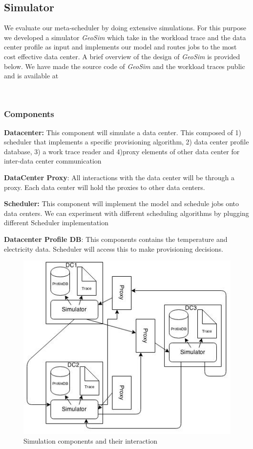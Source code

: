 \documentclass[conference,12pt]{IEEEtran}
\begin{document}
\subsection{Simulator}
\label{sec:simdesign}
We evaluate our meta-scheduler by doing extensive simulations. For this purpose we developed a simulator \textit{GeoSim} which take in the workload trace and the data center profile as input and implements our model and routes jobs to the most cost effective data center. A brief overview of the design of \textit{GeoSim} is provided below. We have made the source code of \textit{GeoSim} and the workload traces public and is available at \cite{sourcecode} 

\

\subsubsection{Components}
\begin{list2} %
\item \textbf{Datacenter:} This component will simulate a data center. This composed of 1) scheduler that implements a specific provisioning algorithm, 2) data center profile database, 3) a work trace reader and 4)proxy elements of other data center for inter-data center communication\
\item \textbf{DataCenter Proxy}: All interactions with the data center will be through a proxy. Each data center will hold the proxies to other data centers.\
\item \textbf{Scheduler:} This component will implement the model and schedule jobs onto data centers. We can experiment with different scheduling algorithms by plugging different Scheduler implementation\
\item \textbf{Datacenter Profile DB}: This components contains the temperature and electricity data. Scheduler will access this to make provisioning decisions.\
\end{list2}

\begin{figure}[] 
\centering
\includegraphics[scale=0.45]{comp_diag}
\caption{Simulation components and their interaction}
\label{fig:component}
\end{figure}
\end{document}
